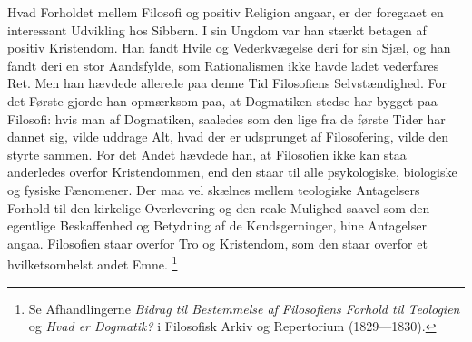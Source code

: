 \documentclass[12pt,a4paper,openany]{book}
\begin{document}
Hvad Forholdet mellem Filosofi og positiv Religion angaar, er der foregaaet en
interessant Udvikling hos Sibbern. I sin Ungdom var han stærkt betagen af
positiv Kristendom. Han fandt Hvile og Vederkvægelse deri for sin Sjæl, og han
fandt deri en stor Aandsfylde, som Rationalismen ikke havde ladet vederfares
Ret. Men han hævdede allerede paa denne Tid Filosofiens Selvstændighed. For det
Første gjorde han opmærksom paa, at Dogmatiken stedse har bygget paa Filosofi:
hvis man af Dogmatiken, saaledes som den lige fra de første Tider har dannet
sig, vilde uddrage Alt, hvad der er udsprunget af Filosofering, vilde den
styrte sammen. For det Andet hævdede han, at Filosofien ikke kan staa
anderledes overfor Kristendommen, end den staar til alle psykologiske,
biologiske og fysiske Fænomener. Der maa vel skælnes mellem teologiske
Antagelsers Forhold til den kirkelige Overlevering og den reale Mulighed saavel
som den egentlige Beskaffenhed og Betydning af de Kendsgerninger, hine
Antagelser angaa. Filosofien staar overfor Tro og Kristendom, som den staar
overfor et hvilketsomhelst andet Emne.%
\footnote[1]{Se Afhandlingerne \textit{Bidrag til Bestemmelse af Filosofiens
Forhold til Teologien} og \textit{Hvad er Dogmatik?} i Filosofisk Arkiv og
Repertorium (1829---1830).}
\end{document}
